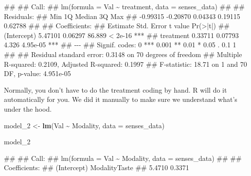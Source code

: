 \documentclass[
]{book}
\newenvironment{Shaded}{\begin{snugshade}}{\end{snugshade}}
\newcommand{\AttributeTok}[1]{\textcolor[rgb]{0.13,0.29,0.53}{#1}}
\newcommand{\FunctionTok}[1]{\textcolor[rgb]{0.13,0.29,0.53}{\textbf{#1}}}
\newcommand{\NormalTok}[1]{#1}
\newcommand{\OtherTok}[1]{\textcolor[rgb]{0.56,0.35,0.01}{#1}}
\newcommand{\SpecialCharTok}[1]{\textcolor[rgb]{0.81,0.36,0.00}{\textbf{#1}}}
\begin{document}
\begin{Shaded}
\begin{Highlighting}[]
\NormalTok{\#\# }
\NormalTok{\#\# Call:}
\NormalTok{\#\# lm(formula = Val \textasciitilde{} treatment, data = senses\_data)}
\NormalTok{\#\# }
\NormalTok{\#\# Residuals:}
\NormalTok{\#\#      Min       1Q   Median       3Q      Max }
\NormalTok{\#\# {-}0.99315 {-}0.20870  0.04343  0.19115  0.62788 }
\NormalTok{\#\# }
\NormalTok{\#\# Coefficients:}
\NormalTok{\#\#             Estimate Std. Error t value Pr(\textgreater{}|t|)    }
\NormalTok{\#\# (Intercept)  5.47101    0.06297  86.889  \textless{} 2e{-}16 ***}
\NormalTok{\#\# treatment    0.33711    0.07793   4.326 4.95e{-}05 ***}
\NormalTok{\#\# {-}{-}{-}}
\NormalTok{\#\# Signif. codes:  0 \textquotesingle{}***\textquotesingle{} 0.001 \textquotesingle{}**\textquotesingle{} 0.01 \textquotesingle{}*\textquotesingle{} 0.05 \textquotesingle{}.\textquotesingle{} 0.1 \textquotesingle{} \textquotesingle{} 1}
\NormalTok{\#\# }
\NormalTok{\#\# Residual standard error: 0.3148 on 70 degrees of freedom}
\NormalTok{\#\# Multiple R{-}squared:  0.2109, Adjusted R{-}squared:  0.1997 }
\NormalTok{\#\# F{-}statistic: 18.71 on 1 and 70 DF,  p{-}value: 4.951e{-}05}
\end{Highlighting}
\end{Shaded}

Normally, you don't have to do the treatment coding by hand. R will do it automatically for you. We did it manually to make sure we understand what's under the hood.

\begin{Shaded}
\begin{Highlighting}[]
\NormalTok{model\_2 }\OtherTok{\textless{}{-}} \FunctionTok{lm}\NormalTok{(Val }\SpecialCharTok{\textasciitilde{}}\NormalTok{ Modality, }\AttributeTok{data =}\NormalTok{ senses\_data)}

\NormalTok{model\_2}
\end{Highlighting}
\end{Shaded}

\begin{Shaded}
\begin{Highlighting}[]
\NormalTok{\#\# }
\NormalTok{\#\# Call:}
\NormalTok{\#\# lm(formula = Val \textasciitilde{} Modality, data = senses\_data)}
\NormalTok{\#\# }
\NormalTok{\#\# Coefficients:}
\NormalTok{\#\#   (Intercept)  ModalityTaste  }
\NormalTok{\#\#        5.4710         0.3371}
\end{Highlighting}
\end{Shaded}
\end{document}
